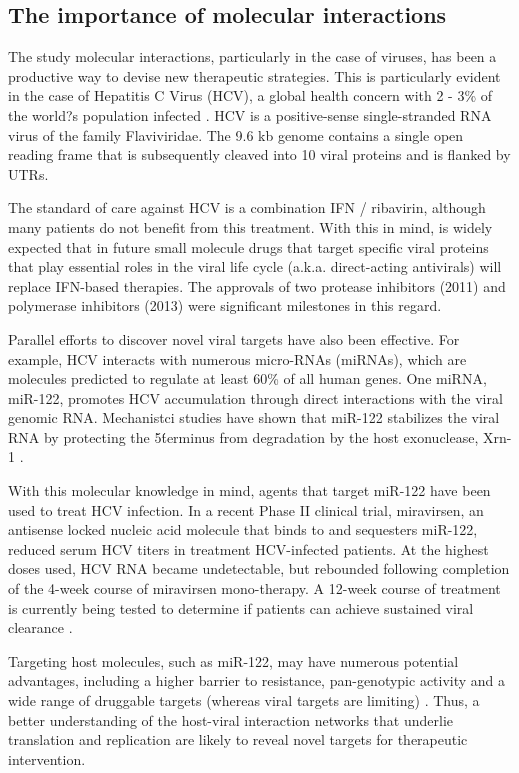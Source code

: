 \subsection{The importance of molecular interactions}

The study molecular interactions, particularly in the case of viruses, has been a productive way to devise new therapeutic strategies. This is particularly evident in the case of Hepatitis C Virus (HCV), a global health concern with 2 - 3\% of the world?s population infected \cite{Wilson:2014ba}. HCV is a positive-sense single-stranded RNA virus of the family Flaviviridae. The 9.6 kb genome contains a single open reading frame that is subsequently cleaved into 10 viral proteins and is flanked by UTRs. 

The standard of care against HCV is a combination IFN / ribavirin, although many patients do not benefit from this treatment. With this in mind, is widely expected that in future small molecule drugs that target specific viral proteins that play essential roles in the viral life cycle (a.k.a. direct-acting antivirals) will replace IFN-based therapies. The approvals of two protease inhibitors (2011) and polymerase inhibitors (2013) were significant milestones in this regard.

Parallel efforts to discover novel viral targets have also been effective. For example, HCV interacts with numerous micro-RNAs (miRNAs), which are molecules predicted to regulate at least 60\% of all human genes. One miRNA, miR-122, promotes HCV accumulation through direct interactions with the viral genomic RNA. Mechanistci studies have shown that miR-122 stabilizes the viral RNA by protecting the 5\'  terminus from degradation by the host exonuclease, Xrn-1 \cite{Wilson:2014ba}.

With this molecular knowledge in mind, agents that target miR-122 have been used to treat HCV infection. In a recent Phase II clinical trial, miravirsen, an antisense locked nucleic acid molecule that binds to and sequesters miR-122, reduced serum HCV titers in treatment HCV-infected patients. At the highest doses used, HCV RNA became undetectable, but rebounded following completion of the 4-week course of miravirsen mono-therapy. A 12-week course of treatment is currently being tested to determine if patients can achieve sustained viral clearance \cite{Wilson:2014ba}.

Targeting host molecules, such as miR-122, may have numerous potential advantages, including a higher barrier to resistance, pan-genotypic activity and a wide range of druggable targets (whereas viral targets are limiting) \cite{Wilson:2014ba}. Thus, a better understanding of the host-viral interaction networks that underlie translation and replication are likely to reveal novel targets for therapeutic intervention.

